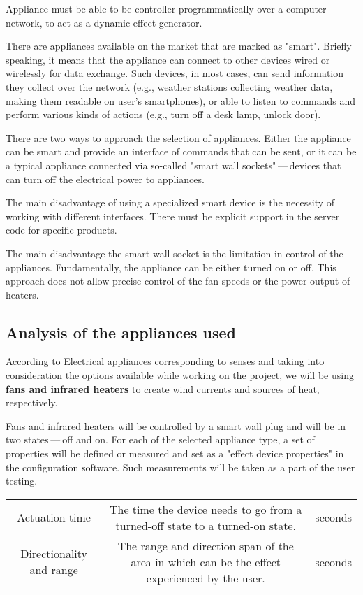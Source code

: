 Appliance must be able to be controller programmatically over a computer network,
to act as a dynamic effect generator.


There are appliances available on the market that are marked as "smart".
Briefly speaking, it means that the appliance
can connect to other devices wired or wirelessly for data exchange. \hyperlink{wisd}{}
Such devices, in most cases, can send information they collect over
the network (e.g., weather stations collecting weather data, making them readable
on user’s smartphones), or able to listen to commands and perform various
kinds of actions (e.g., turn off a desk lamp, unlock door).


There are two ways to approach the selection of appliances. Either the
appliance can be smart and provide an interface of commands that can be sent, or
it can be a typical appliance connected via so-called "smart wall sockets" — devices that can turn off the electrical power to appliances.


The main disadvantage of using a specialized smart device is the necessity of
working with different interfaces. There must be explicit
support in the server code for specific products.


The main disadvantage the smart wall socket is the limitation in
control of the appliances. Fundamentally, the appliance can be either turned on or off.
This approach does not allow precise control of the fan speeds or the power output
of heaters.


\hypertarget{x-analysis-of-the-appliances-used}{\subsection*{Analysis of the appliances used}}
According to \hyperlink{appltable}{Electrical appliances corresponding to senses} and taking into consideration the
options available while working on the project, we will be using \textbf{fans
and infrared heaters}
to create wind currents and sources of heat, respectively.


Fans and infrared heaters will be controlled by a smart wall plug
and will be in two states — off and on. For each of the selected appliance
type, a set of properties will be defined
or measured and set as a "effect device properties" in the configuration
software. Such measurements will be taken as a part of the user testing.


\begin{center}
\begin{tabular}{|c|c|c|}
\hline
Actuation time & The time the device needs to go from a turned-off state to
  a turned-on state. & seconds \\ 
Directionality and range & The range and direction span of the area in
  which can be the effect experienced by the user. & seconds \\ 
\hline
\end{tabular}
\end{center}

